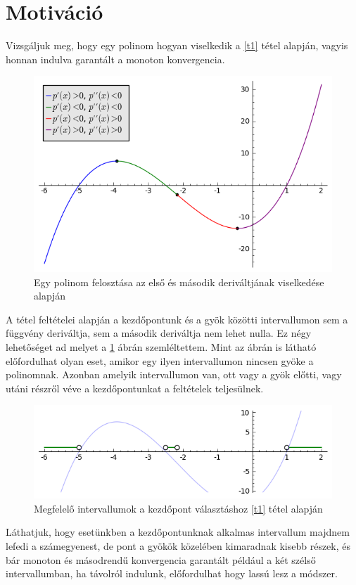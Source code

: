 \documentclass[a4paper,12pt]{report}
\begin{document}
		\section{Motiváció}
						Vizsgáljuk meg, hogy egy polinom hogyan viselkedik a \ref{t1} tétel alapján, vagyis honnan indulva garantált a monoton konvergencia.
			\begin{figure}[htp]
				\centering
				\includegraphics[scale=0.6]{kep2.png}
				\caption{Egy polinom felosztása az első és második deriváltjának viselkedése alapján}\label{k2}
			\end{figure}
			A tétel feltételei alapján a kezdőpontunk és a gyök közötti intervallumon sem a függvény deriváltja, sem a második deriváltja nem lehet nulla. Ez négy lehetőséget ad melyet a \ref{k2} ábrán szemléltettem. Mint az ábrán is látható előfordulhat olyan eset, amikor egy ilyen intervallumon nincsen gyöke a polinomnak. Azonban amelyik intervallumon van, ott vagy a gyök előtti, vagy utáni részről véve a kezdőpontunkat a feltételek teljesülnek.
			\begin{figure}[htp]
				\centering
				\includegraphics[scale=0.6]{kep3.png}
				\caption{Megfelelő intervallumok a kezdőpont választáshoz \ref{t1} tétel alapján}\label{k3}
			\end{figure}
			Láthatjuk, hogy esetünkben a kezdőpontunknak alkalmas intervallum majdnem lefedi a számegyenest, de pont a gyökök közelében kimaradnak kisebb részek, és bár monoton és másodrendű konvergencia garantált például a két szélső intervallumban, ha távolról indulunk, előfordulhat hogy lassú lesz a módszer.
			
\end{document}

